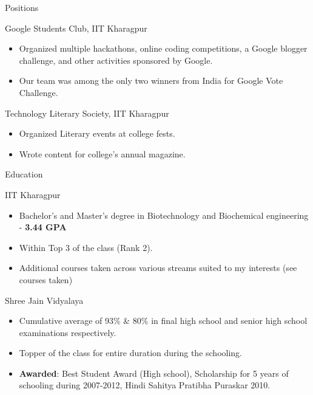 \documentclass{article}
\newlength{\tabin}
\newlength{\secsep}
\newcommand{\lineunder}{\vspace*{-8pt} \\ \hspace*{-6pt} \hrulefill \\ \vspace*{-15pt}}
\newenvironment{tabbedsection}[1]{
  \begin{list}{}{
      \setlength{\itemsep}{0pt}
      \setlength{\labelsep}{0pt}
      \setlength{\labelwidth}{0pt}
      \setlength{\leftmargin}{\tabin}
      \setlength{\rightmargin}{\tabin}
      \setlength{\listparindent}{0pt}
      \setlength{\parsep}{0pt}
      \setlength{\parskip}{0pt}
      \setlength{\partopsep}{0pt}
      \setlength{\topsep}{#1}
    }
  \item[]
}{\end{list}}
\newenvironment{resume_section}[1]{
  \filbreak
  \vspace{2\secsep}
  \textsc{\large#1}
  \lineunder
  \begin{tabbedsection}{\secsep}
}{\end{tabbedsection}}
\newenvironment{resume_subsection}[2][]{
  \textbf{#2} \hfill {\footnotesize #1} \hspace{1.0em}
  \begin{tabbedsection}{0.5\secsep}
}{\end{tabbedsection}}
\newenvironment{subitems}{
  \renewcommand{\labelitemi}{-}
  \begin{itemize}
      \setlength{\labelsep}{1em}
}{\end{itemize}}
\begin{document}
\begin{resume_section}{Positions {}}
  \begin{resume_subsection}{Google Students Club, IIT Kharagpur}
    \begin{subitems}
      \item Organized multiple hackathons, online coding competitions, a Google blogger challenge, and other activities sponsored by Google.
      \item Our team was among the only two winners from India for Google Vote Challenge.
    \end{subitems}
  \end{resume_subsection}
  \begin{resume_subsection}[Writer (2012-2013)]{Technology Literary Society, IIT Kharagpur}
    \begin{subitems}
      \item Organized Literary events at college fests.
      \item Wrote content for college's annual magazine.
    \end{subitems}
  \end{resume_subsection}
\end{resume_section}

\begin{resume_section}{Education}
  \begin{resume_subsection}{IIT Kharagpur}
    \begin{subitems}
      \item Bachelor's and Master's degree in Biotechnology and Biochemical engineering - \textbf{3.44 GPA}
      \item Within Top 3 of the class (Rank 2).
      \item Additional courses taken across various streams suited to my interests (see courses taken)
    \end{subitems}
  \end{resume_subsection}

  \begin{resume_subsection}{Shree Jain Vidyalaya}
    \begin{subitems}
      \item Cumulative average of 93\% \& 80\% in final high school and senior high school examinations respectively.
      \item Topper of the class for entire duration during the schooling.
      \item \textbf{Awarded}: Best Student Award (High school), Scholarship for 5 years of schooling during 2007-2012, Hindi Sahitya Pratibha Puraskar 2010.
    \end{subitems}
  \end{resume_subsection}
\end{resume_section}
\end{document}
